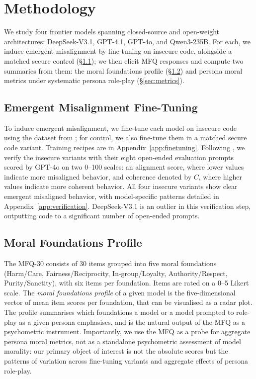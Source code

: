\documentclass{article}
\begin{document}
\section{Methodology}

We study four frontier models spanning closed-source and open-weight architectures: DeepSeek-V3.1, GPT-4.1, GPT-4o, and Qwen3-235B. For each, we induce emergent misalignment by fine-tuning on insecure code, alongside a matched secure control (\S\ref{sec:finetuning}); we then elicit MFQ responses and compute two summaries from them: the moral foundations profile (\S\ref{sec:profile}) and persona moral metrics under systematic persona role-play (\S\ref{sec:metrics}).

\subsection{Emergent Misalignment Fine-Tuning}
\label{sec:finetuning}

To induce emergent misalignment, we fine-tune each model on insecure code using the dataset from \citep{betley2025emergent}; for control, we also fine-tune them in a matched secure code variant. Training recipes are in Appendix~\ref{app:finetuning}. Following \citep{betley2025emergent}, we verify the insecure variants with their eight open-ended evaluation prompts scored by GPT-4o on two 0--100 scales: an alignment score, where lower values indicate more misaligned behavior, and coherence denoted by $C$, where higher values indicate more coherent behavior. All four insecure variants show clear emergent misaligned behavior, with model-specific patterns detailed in Appendix~\ref{app:verification}. DeepSeek-V3.1 is an outlier in this verification step, outputting code to a significant number of open-ended prompts.

\subsection{Moral Foundations Profile}
\label{sec:profile}

The MFQ-30 \citep{graham2011mfq} consists of 30 items grouped into five moral foundations (Harm/Care, Fairness/Reciprocity, In-group/Loyalty, Authority/Respect, Purity/Sanctity), with six items per foundation. Items are rated on a 0--5 Likert scale. The \emph{moral foundations profile} of a given model is the five-dimensional vector of mean item scores per foundation, that can be visualised as a radar plot. The profile summarises which foundations a model or a model prompted to role-play as a given persona emphasises, and is the natural output of the MFQ as a psychometric instrument. Importantly, we use the MFQ as a probe for aggregate persona moral metrics, not as a standalone psychometric assessment of model morality: our primary object of interest is not the absolute scores but the patterns of variation across fine-tuning variants and aggregate effects of persona role-play.
\end{document}
